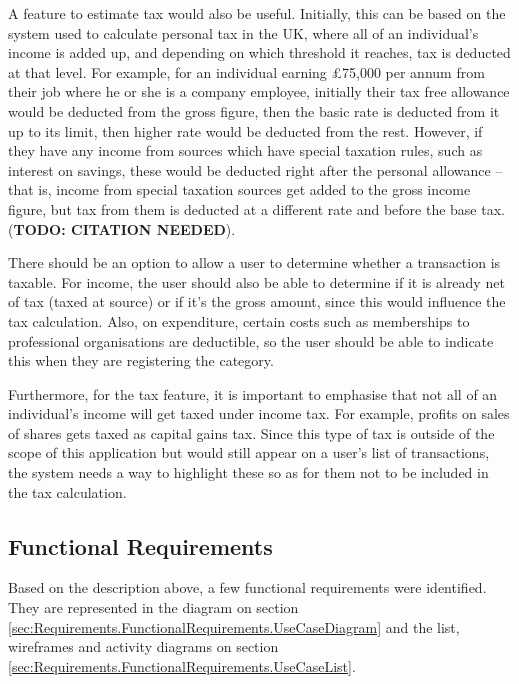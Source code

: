 A feature to estimate tax would also be useful. Initially, this can be based on
the system used to calculate personal tax in the UK, where all of an
individual's income is added up, and depending on which threshold it reaches,
tax is deducted at that level. For example, for an individual earning
\pounds75,000 per annum from their job where he or she is a company employee,
initially their tax free allowance would be deducted from the gross figure,
then the basic rate is deducted from it up to its limit, then higher rate would
be deducted from the rest. However, if they have any income from sources which
have special taxation rules, such as interest on savings, these would be
deducted right after the personal allowance -- that is, income from special
taxation sources get added to the gross income figure, but tax from them is
deducted at a different rate and before the base tax. (\textbf{TODO: CITATION
NEEDED}).

There should be an option to allow a user to determine whether a transaction is
taxable. For income, the user should also be able to determine if it is already
net of tax (taxed at source) or if it's the gross amount, since this would
influence the tax calculation. Also, on expenditure, certain costs such as
memberships to professional organisations are deductible, so the user should be
able to indicate this when they are registering the category.

Furthermore, for the tax feature, it is important to emphasise that not all of
an individual's income will get taxed under income tax. For example, profits on
sales of shares gets taxed as capital gains tax. Since this type of tax is
outside of the scope of this application but would still appear on a user's
list of transactions, the system needs a way to highlight these so as for them
not to be included in the tax calculation.



\subsection{Functional Requirements} \label{sec:Requirements.FunctionalRequirements}

Based on the description above, a few functional requirements were identified.
They are represented in the diagram on section
\ref{sec:Requirements.FunctionalRequirements.UseCaseDiagram} and the list,
wireframes and activity diagrams on section
\ref{sec:Requirements.FunctionalRequirements.UseCaseList}.

